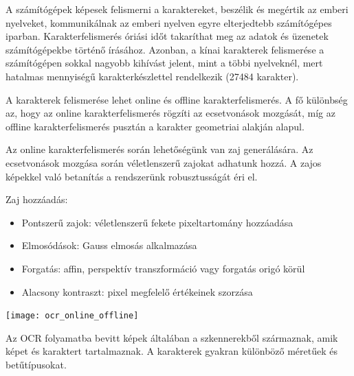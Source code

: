 A számítógépek képesek felismerni a karaktereket, beszélik és megértik az emberi nyelveket, kommunikálnak az emberi nyelven egyre elterjedtebb számítógépes iparban. Karakterfelismerés óriási időt takaríthat meg az adatok és üzenetek számítógépekbe történő írásához. Azonban, a kínai karakterek felismerése a számítógépen sokkal nagyobb kihívást jelent, mint a többi nyelveknél, mert hatalmas mennyiségű karakterkészlettel rendelkezik (27484 karakter).

A karakterek felismerése lehet online és offline karakterfelismerés. A fő különbség az, hogy az online karakterfelismerés rögzíti az ecsetvonások mozgását, míg az offline karakterfelismerés pusztán a karakter geometriai alakján alapul.

Az online karakterfelismerés során lehetőségünk van zaj generálására. Az ecsetvonások mozgása során véletlenszerű zajokat adhatunk hozzá. A zajos képekkel való betanítás a rendszerünk robusztusságát éri el.

Zaj hozzáadás:
\begin{itemize}
\item Pontszerű zajok: véletlenszerű fekete pixeltartomány hozzáadása
\item Elmosódások: Gauss elmosás alkalmazása
\item Forgatás: affin, perspektív transzformáció vagy forgatás origó körül 
\item Alacsony kontraszt: pixel megfelelő értékeinek szorzása
\end{itemize}

\begin{center}
\texttt{[image: ocr\_online\_offline]}
\end{center}

Az OCR folyamatba bevitt képek általában a szkennerekből származnak, amik képet és karaktert tartalmaznak. A karakterek gyakran különböző méretűek és betűtípusokat.

